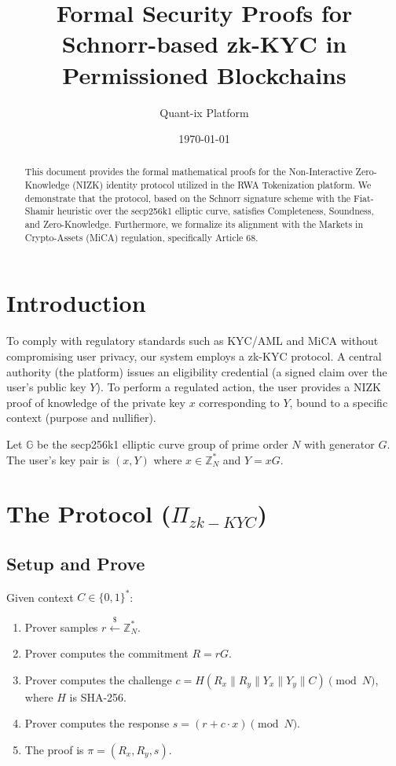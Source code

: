 \documentclass[11pt,a4paper]{article}
\title{Formal Security Proofs for Schnorr-based zk-KYC in Permissioned Blockchains}
\author{Quant-ix Platform}
\date{\today}
\begin{document}
\maketitle

\begin{abstract}
This document provides the formal mathematical proofs for the Non-Interactive Zero-Knowledge (NIZK) identity protocol utilized in the RWA Tokenization platform. We demonstrate that the protocol, based on the Schnorr signature scheme with the Fiat-Shamir heuristic over the secp256k1 elliptic curve, satisfies Completeness, Soundness, and Zero-Knowledge. Furthermore, we formalize its alignment with the Markets in Crypto-Assets (MiCA) regulation, specifically Article 68.
\end{abstract}

\section{Introduction}
To comply with regulatory standards such as KYC/AML and MiCA without compromising user privacy, our system employs a zk-KYC protocol. A central authority (the platform) issues an eligibility credential (a signed claim over the user's public key $Y$). To perform a regulated action, the user provides a NIZK proof of knowledge of the private key $x$ corresponding to $Y$, bound to a specific context (purpose and nullifier).

Let $\mathbb{G}$ be the secp256k1 elliptic curve group of prime order $N$ with generator $G$.
The user's key pair is $(x, Y)$ where $x \in \mathbb{Z}_N^*$ and $Y = xG$.

\section{The Protocol ($\Pi_{zk-KYC}$)}
\subsection{Setup and Prove}
Given context $C \in \{0, 1\}^*$:
\begin{enumerate}
    \item Prover samples $r \xleftarrow{\$} \mathbb{Z}_N^*$.
    \item Prover computes the commitment $R = rG$.
    \item Prover computes the challenge $c = H(R_x \parallel R_y \parallel Y_x \parallel Y_y \parallel C) \pmod N$, where $H$ is SHA-256.
    \item Prover computes the response $s = (r + c \cdot x) \pmod N$.
    \item The proof is $\pi = (R_x, R_y, s)$.
\end{enumerate}
\end{document}
